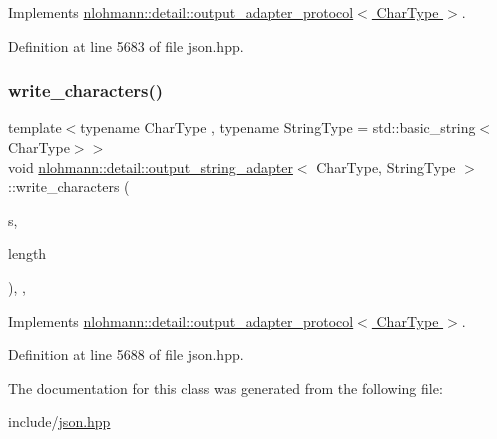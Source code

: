 Implements \hyperlink{structnlohmann_1_1detail_1_1output__adapter__protocol_a3381896fe1be557f591de2e917cdc7d5}{nlohmann\+::detail\+::output\+\_\+adapter\+\_\+protocol$<$ Char\+Type $>$}.



Definition at line 5683 of file json.\+hpp.

\mbox{\label{classnlohmann_1_1detail_1_1output__string__adapter_ab5ea4da075305d225dfd84ad997e8747}} 
\subsubsection{\texorpdfstring{write\+\_\+characters()}{write\_characters()}}
{\footnotesize\ttfamily template$<$typename Char\+Type , typename String\+Type  = std\+::basic\+\_\+string$<$\+Char\+Type$>$$>$ \\
void \hyperlink{classnlohmann_1_1detail_1_1output__string__adapter}{nlohmann\+::detail\+::output\+\_\+string\+\_\+adapter}$<$ Char\+Type, String\+Type $>$\+::write\+\_\+characters (\begin{DoxyParamCaption}\item[{const Char\+Type $\ast$}]{s,  }\item[{std\+::size\+\_\+t}]{length }\end{DoxyParamCaption})\hspace{0.3cm}{\ttfamily [inline]}, {\ttfamily [override]}, {\ttfamily [virtual]}}



Implements \hyperlink{structnlohmann_1_1detail_1_1output__adapter__protocol_a2f410a164e0eda17cf6561114b0eee4a}{nlohmann\+::detail\+::output\+\_\+adapter\+\_\+protocol$<$ Char\+Type $>$}.



Definition at line 5688 of file json.\+hpp.



The documentation for this class was generated from the following file\+:\begin{DoxyCompactItemize}
\item 
include/\hyperlink{json_8hpp}{json.\+hpp}\end{DoxyCompactItemize}
